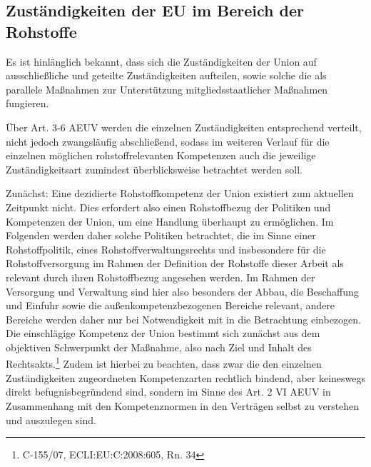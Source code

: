 \documentclass[12pt,a4paper,oneside]{book} %
\begin{document}
\subsection{Zuständigkeiten der EU im Bereich der Rohstoffe}

Es ist hinlänglich bekannt, dass sich die Zuständigkeiten der Union auf ausschließliche und geteilte Zuständigkeiten aufteilen, sowie solche die als parallele Maßnahmen zur Unterstützung mitgliedsstaatlicher Maßnahmen fungieren.\autocite{Groeben, von der/Schwarze/Walter Obwexer, 7. Aufl. 2015, AEUV Art. 2 Rn. 7}

Über Art. 3-6 AEUV werden die einzelnen Zuständigkeiten entsprechend verteilt, nicht jedoch zwangsläufig abschließend, sodass im weiteren Verlauf für die einzelnen möglichen rohstoffrelevanten Kompetenzen auch die jeweilige Zuständigkeitsart zumindest überblicksweise betrachtet werden soll.
	
Zunächst: Eine dezidierte Rohstoffkompetenz der Union existiert zum aktuellen Zeitpunkt nicht. Dies erfordert also einen Rohstoffbezug der Politiken und Kompetenzen der Union, um eine Handlung überhaupt zu ermöglichen. Im Folgenden werden daher solche Politiken betrachtet, die im Sinne einer Rohstoffpolitik, eines Rohstoffverwaltungsrechts und insbesondere für die Rohstoffversorgung im Rahmen der Definition der Rohstoffe dieser Arbeit als relevant durch ihren Rohstoffbezug angesehen werden. Im Rahmen der Versorgung und Verwaltung sind hier also besonders der Abbau, die Beschaffung und Einfuhr sowie die außenkompetenzbezogenen Bereiche relevant, andere Bereiche werden daher nur bei Notwendigkeit mit in die Betrachtung einbezogen. Die einschlägige Kompetenz der Union bestimmt sich zunächst aus dem objektiven Schwerpunkt der Maßnahme, also nach Ziel und Inhalt des Rechtsakts.\footnote{C-155/07, ECLI:EU:C:2008:605, Rn. 34}
Zudem ist hierbei zu beachten, dass zwar die den einzelnen Zuständigkeiten zugeordneten Kompetenzarten rechtlich bindend, aber keineswegs direkt befugnisbegründend sind, sondern im Sinne des Art. 2 VI AEUV in Zusammenhang mit den Kompetenznormen in den Verträgen selbst zu verstehen und auszulegen sind.\autocite{Groeben, von der/Schwarze/Walter Obwexer, 7. Aufl. 2015, AEUV Art. 2 Rn. 9}
	
\end{document}

